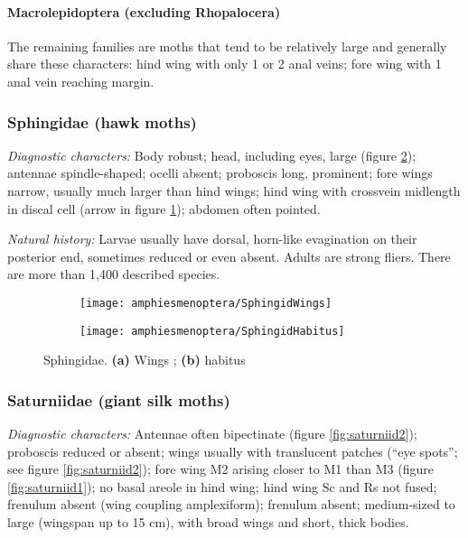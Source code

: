 \FloatBarrier
\paragraph{Macrolepidoptera (excluding Rhopalocera)} The remaining families are moths that tend to be relatively large and generally share these characters: hind wing with only 1 or 2 anal veins; fore wing with 1 anal vein reaching margin.\vspace{3mm}

\subsubsection{Sphingidae (hawk moths)}
\noindent{}\textit{Diagnostic characters:} Body robust; head, including eyes, large (figure \ref{fig:sphingid2}); antennae spindle-shaped; ocelli absent; proboscis long, prominent; fore wings narrow, usually much larger than hind wings; hind wing with crossvein midlength in discal cell (arrow in figure \ref{fig:sphingid1}); abdomen often pointed.\vspace{3mm}

\noindent{}\textit{Natural history:} Larvae usually have dorsal, horn-like evagination on their posterior end, sometimes reduced or even absent. Adults are strong fliers. There are more than 1,400 described species.\vspace{3mm}

\begin{figure}[ht!]
    \centering
    \begin{subfigure}[ht!]{0.35\textwidth}
        \texttt{[image: amphiesmenoptera/SphingidWings]}
        \caption{}
        \label{fig:sphingid1}
    \end{subfigure}
    \hfill
    \begin{subfigure}[ht!]{0.6\textwidth}
        \texttt{[image: amphiesmenoptera/SphingidHabitus]}
        \caption{}
        \label{fig:sphingid2}
    \end{subfigure}
    \caption{Sphingidae. \textbf{(a)} Wings \citep[][Plate XIII, Fig. 3]{bhl38041}; \textbf{(b)} habitus \citep[][Plate 67, Fig. 4]{druce1900biologia}}\label{fig:sphingids}
\end{figure}

\subsubsection{Saturniidae (giant silk moths)}
\noindent{}\textit{Diagnostic characters:} Antennae often bipectinate (figure \ref{fig:saturniid2}); proboscis reduced or absent; wings usually with translucent patches (``eye spots''; see figure \ref{fig:saturniid2}); fore wing M2 arising closer to M1 than M3 (figure \ref{fig:saturniid1}); no basal areole in hind wing; hind wing Sc and Rs not fused; frenulum absent (wing coupling amplexiform); frenulum absent; medium-sized to large (wingspan up to 15 cm), with broad wings and short, thick bodies.\vspace{3mm}

